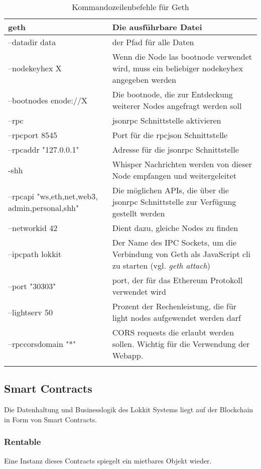 \begin{table}[H]
\centering
\caption{Kommandozeilenbefehle für Geth\cite[Wiki/Management APIs]{go-ethereum}}
\label{tbl:geth cli}
\begin{tabular}{@{}L{4cm}L{10cm}@{}}
\toprule
geth & Die ausführbare Datei \\ \midrule
--datadir data & der Pfad für alle Daten \\ \midrule
--nodekeyhex X & Wenn die Node las bootnode verwendet wird, muss ein beliebiger nodekeyhex angegeben werden \\ \midrule
--bootnodes enode://X & Die bootnode, die zur Entdeckung weiterer Nodes angefragt werden soll \\ \midrule
--rpc & jsonrpc Schnittstelle aktivieren \\ \midrule
--rpcport 8545 & Port für die rpcjson Schnittstelle \\ \midrule
--rpcaddr "127.0.0.1" & Adresse für die jsonrpc Schnittstelle \\ \midrule
-shh & Whisper Nachrichten werden von dieser Node empfangen und weitergeleitet \\ \midrule
--rpcapi "ws,eth,net,web3, admin,personal,shh" & Die möglichen APIs, die über die jsonrpc Schnittstelle zur Verfügung gestellt werden \\ \midrule
--networkid 42 & Dient dazu, gleiche Nodes zu finden \\ \midrule
--ipcpath lokkit & Der Name des IPC Sockets, um die Verbindung von Geth als JavaScript cli zu starten (vgl. \emph{geth attach}) \\ \midrule
--port "30303" & port, der für das Ethereum Protokoll verwendet wird \\ \midrule
--lightserv 50 & Prozent der Rechenleistung, die für light nodes aufgewendet werden darf \\ \midrule
--rpccorsdomain "*" & CORS requests die erlaubt werden sollen. Wichtig für die Verwendung der Webapp. \\ \midrule
 \\ \bottomrule
\end{tabular}
\end{table}

\subsection{Smart Contracts}
Die Datenhaltung und Businesslogik des Lokkit Systems liegt auf der Blockchain in Form von Smart Contracts.
\subsubsection{Rentable}
\label{sys_subsubsec:Rentable}
Eine Instanz dieses Contracts spiegelt ein mietbares Objekt wieder.

